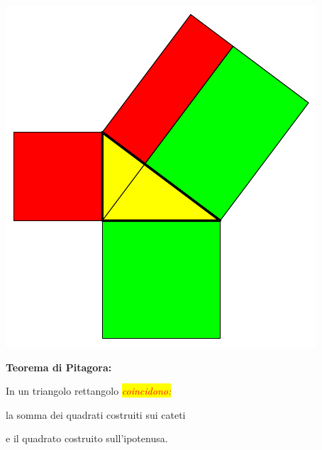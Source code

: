 \documentclass[italian,landscape]{report}
\newcommand{\rosso}[1]{\textcolor{red}{#1}}
\newcommand{\sfondogiallo}[1]{\colorbox{yellow}{#1}}
\begin{document}
\begin{center}
\includegraphics[scale=1.2]{pitagora3}
\end{center}

\begin{firstheadlineitemize}

\item \textbf{Teorema di Pitagora:}

\begin{secondheadlineitemize}

\item  In un triangolo rettangolo \sfondogiallo{\rosso{\textit{coincidono:}}}

\begin{thirdheadlineitemize}

\item la somma dei quadrati costruiti sui cateti

\item e il quadrato costruito sull'ipotenusa.

\end{thirdheadlineitemize}

\end{secondheadlineitemize}

\end{firstheadlineitemize}

\pageTransitionBlindsV
\end{document}

